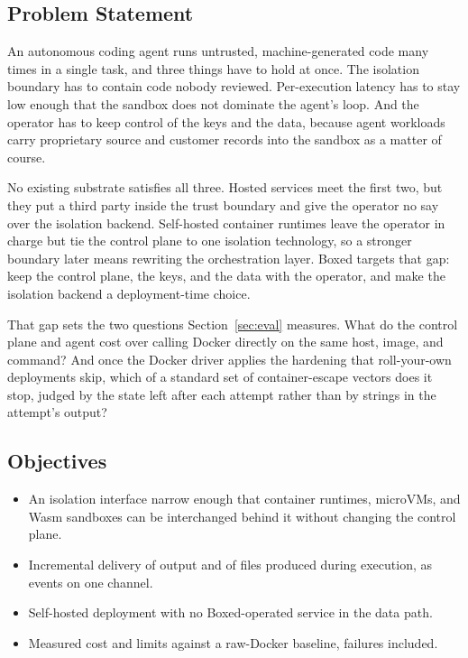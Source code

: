 \documentclass[conference]{IEEEtran}
\begin{document}
\subsection{Problem Statement}

An autonomous coding agent runs untrusted, machine-generated code many times
in a single task, and three things have to hold at once. The isolation
boundary has to contain code nobody reviewed. Per-execution latency has to
stay low enough that the sandbox does not dominate the agent's loop. And the
operator has to keep control of the keys and the data, because agent
workloads carry proprietary source and customer records into the sandbox as
a matter of course.

No existing substrate satisfies all three. Hosted services meet the first
two, but they put a third party inside the trust boundary and give the
operator no say over the isolation backend. Self-hosted container runtimes
leave the operator in charge but tie the control plane to one isolation
technology, so a stronger boundary later means rewriting the orchestration
layer. Boxed targets that gap: keep the control plane, the keys, and the data
with the operator, and make the isolation backend a deployment-time choice.

That gap sets the two questions Section~\ref{sec:eval} measures. What do
the control plane and agent cost over calling Docker directly on the same
host, image, and command? And once the Docker driver applies the hardening
that roll-your-own deployments skip, which of a standard set of
container-escape vectors does it stop, judged by the state left after each
attempt rather than by strings in the attempt's output?

\subsection{Objectives}

\begin{itemize}
\item An isolation interface narrow enough that container runtimes,
microVMs, and Wasm sandboxes can be interchanged behind it without changing
the control plane.
\item Incremental delivery of output and of files produced during
execution, as events on one channel.
\item Self-hosted deployment with no Boxed-operated service in the data
path.
\item Measured cost and limits against a raw-Docker baseline, failures
included.
\end{itemize}
\end{document}
